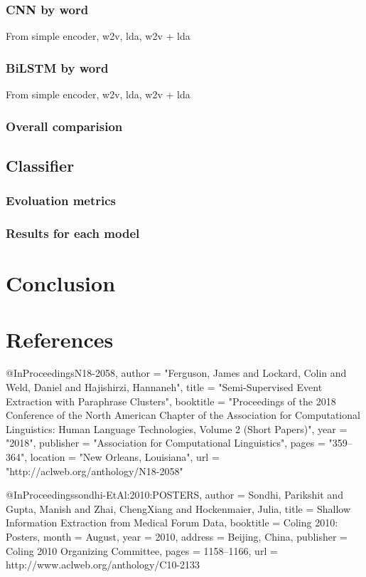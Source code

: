 \documentclass[11pt]{article}
\begin{document}
\subsubsection{CNN by word}

From simple encoder, w2v, lda, w2v + lda

\subsubsection{BiLSTM by word}

From simple encoder, w2v, lda, w2v + lda

\subsubsection{Overall comparision}

\subsection{Classifier}
\subsubsection{Evoluation metrics}
\subsubsection{Results for each model}


\section{Conclusion}


\section{References}

@InProceedings{N18-2058,
  author = 	"Ferguson, James
		and Lockard, Colin
		and Weld, Daniel
		and Hajishirzi, Hannaneh",
  title = 	"Semi-Supervised Event Extraction with Paraphrase Clusters",
  booktitle = 	"Proceedings of the 2018 Conference of the North American Chapter of the Association for Computational Linguistics: Human Language Technologies, Volume 2 (Short Papers)",
  year = 	"2018",
  publisher = 	"Association for Computational Linguistics",
  pages = 	"359--364",
  location = 	"New Orleans, Louisiana",
  url = 	"http://aclweb.org/anthology/N18-2058"
}

@InProceedings{sondhi-EtAl:2010:POSTERS,
  author    = {Sondhi, Parikshit  and  Gupta, Manish  and  Zhai, ChengXiang  and  Hockenmaier, Julia},
  title     = {Shallow Information Extraction from Medical Forum Data},
  booktitle = {Coling 2010: Posters},
  month     = {August},
  year      = {2010},
  address   = {Beijing, China},
  publisher = {Coling 2010 Organizing Committee},
  pages     = {1158--1166},
  url       = {http://www.aclweb.org/anthology/C10-2133}
}
\end{document}
